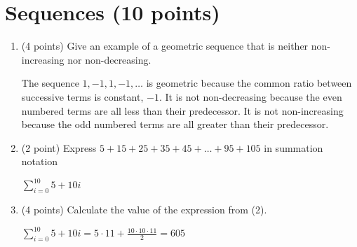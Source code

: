 \documentclass[11pt]{article}
\def\sectionOneA#1{}
\def\sectionTwoA#1{#1}
\newcounter{pgpts}
\begin{document}
\section{Sequences (10 points)}\addtocounter{pgpts}{10}
\begin{enumerate}
    \item (4 points) \sectionOneA{Give an example of a geometric sequence that is neither increasing nor decreasing.} \sectionTwoA{Give an example of a geometric sequence that is neither non-increasing nor non-decreasing.}  %
    
    \sectionOneA{The sequence $1,-1,1,-1,\dots$ is geometric because the common ratio between successive terms is constant, $-1$. It is not increasing because the even numbered terms are all less than their predecessor. It is not decreasing because the odd numbered terms are all greater than their predecessor.
    }
    \sectionTwoA{The sequence $1,-1,1,-1,\dots$ is geometric because the common ratio between successive terms is constant, $-1$. It is not non-decreasing because the even numbered terms are all less than their predecessor. It is not non-increasing because the odd numbered terms are all greater than their predecessor.
    }
    \vspace{6cm}
    \item (2 point) %
    Express \sectionOneA{$8+16+24+32+40+\dots+88+96$}\sectionTwoA{$5+15+25+35+45+\dots+95+105$} in summation notation
    
    \sectionOneA{
    $\sum_{i=1}^{12} 8i$}
    \sectionTwoA{
    $\sum_{i=0}^{10} 5+10i$
    }
    
    \vspace{4cm}
    \item (4 points) Calculate the value of the expression from (2).
    \sectionOneA{
    $\sum_{i=1}^{12} 8i= 8\sum_{i=1}^{12}i = 8\frac{12 \cdot 13}{2} = 8\cdot 6 \cdot 13= 624.$
    }
    \sectionTwoA{
    $\sum_{i=0}^{10} 5+10i = 5\cdot11+\frac{10\cdot 10 \cdot 11}{2} = 605$
    }
    \vspace{3cm}
    \vspace{3cm}
\end{enumerate}
\end{document}

